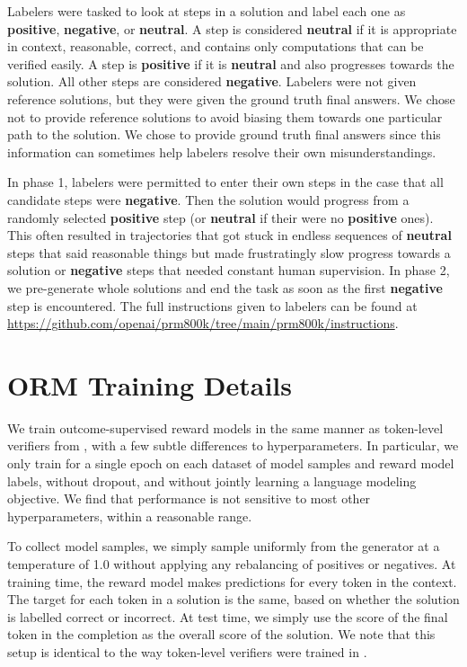 \documentclass{article}
\begin{document}
Labelers were tasked to look at steps in a solution and label each one as \textbf{positive}, \textbf{negative}, or \textbf{neutral}. A step is considered \textbf{neutral} if it is appropriate in context, reasonable, correct, and contains only computations that can be verified easily. A step is \textbf{positive} if it is \textbf{neutral} and also progresses towards the solution. All other steps are considered \textbf{negative}. Labelers were not given reference solutions, but they were given the ground truth final answers. We chose not to provide reference solutions to avoid biasing them towards one particular path to the solution. We chose to provide ground truth final answers since this information can sometimes help labelers resolve their own misunderstandings.

In phase 1, labelers were permitted to enter their own steps in the case that all candidate steps were \textbf{negative}. Then the solution would progress from a randomly selected \textbf{positive} step (or \textbf{neutral} if their were no \textbf{positive} ones). This often resulted in trajectories that got stuck in endless sequences of \textbf{neutral} steps that said reasonable things but made frustratingly slow progress towards a solution or \textbf{negative} steps that needed constant human supervision. In phase 2, we pre-generate whole solutions and end the task as soon as the first \textbf{negative} step is encountered. The full instructions given to labelers can be found at \href{https://github.com/openai/prm800k/tree/main/prm800k/instructions}{https://github.com/openai/prm800k/tree/main/prm800k/instructions}.

\section{ORM Training Details} \label{appendix:orm_details}

We train outcome-supervised reward models in the same manner as token-level verifiers from \cite{cobbe2021training}, with a few subtle differences to hyperparameters. In particular, we only train for a single epoch on each dataset of model samples and reward model labels, without dropout, and without jointly learning a language modeling objective. We find that performance is not sensitive to most other hyperparameters, within a reasonable range.

To collect model samples, we simply sample uniformly from the generator at a temperature of 1.0 without applying any rebalancing of positives or negatives. At training time, the reward model makes predictions for every token in the context. The target for each token in a solution is the same, based on whether the solution is labelled correct or incorrect. At test time, we simply use the score of the final token in the completion as the overall score of the solution. We note that this setup is identical to the way token-level verifiers were trained in \cite{cobbe2021training}.
\end{document}
